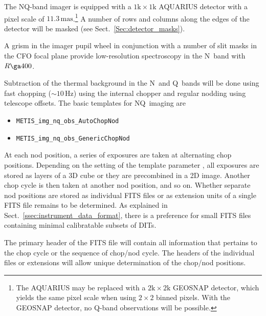 The NQ-band imager is equipped with a $1\mathrm{k}\times 1\mathrm{k}$
AQUARIUS detector with a pixel scale of
$11.3\,\mathrm{mas}$.\footnote{The AQUARIUS may be replaced with a
  $2\mathrm{k}\times2\mathrm{k}$ GEOSNAP detector, which yields the
  same pixel scale when using $2\times2$ binned pixels. With the
  GEOSNAP detector, no Q-band observations will be possible.} A number
of rows and columns along the edges of the detector will be masked
(see Sect.\ \ref{Sec:detector_masks}).

A grism in the imager pupil wheel in conjunction with a number of slit
masks in the CFO focal plane provide low-resolution spectroscopy in
the N~band with $R\ga 400$.

Subtraction of the thermal background in the N~and Q~bands will be
done using fast chopping ($\sim 10\,\mathrm{Hz}$) using the internal
chopper and regular nodding using telescope offsets. The basic
templates for NQ~imaging are
\begin{itemize}
\item \lstinline{METIS_img_nq_obs_AutoChopNod}
\item \lstinline{METIS_img_nq_obs_GenericChopNod}
\end{itemize}

At each nod position, a series of exposures are taken at alternating
chop positions. Depending on the setting of the template parameter
, all exposures are stored as layers of a 3D cube
or they are precombined in a 2D image. Another chop cycle is then
taken at another nod position, and so on. Whether separate nod
positions are stored as individual FITS files or as extension units of
a single FITS file remains to be determined. As explained in
Sect.~\ref{ssec:instrument_data_format}, there is a preference for
small FITS files containing minimal calibratable subsets of DITs.

The primary header of the FITS file will contain all information that
pertains to the chop cycle or the sequence of chop/nod cycle. The
headers of the individual files or extensions will allow unique
determination of the chop/nod positions.

